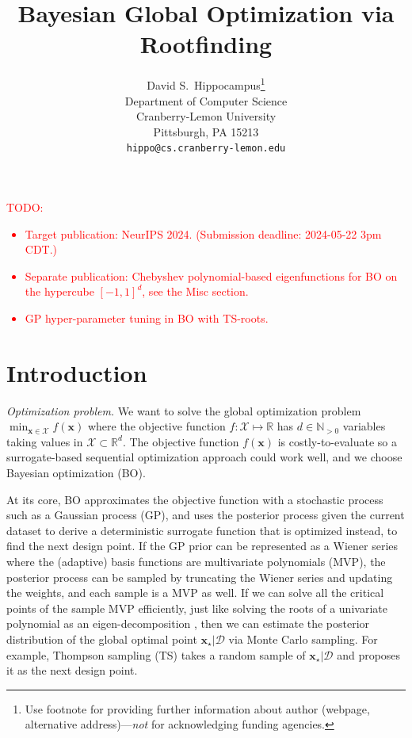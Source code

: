\documentclass{article}
\title{Bayesian Global Optimization via Rootfinding}
\author{%
  David S.~Hippocampus\thanks{Use footnote for providing further information
    about author (webpage, alternative address)---\emph{not} for acknowledging
    funding agencies.} \\
  Department of Computer Science\\
  Cranberry-Lemon University\\
  Pittsburgh, PA 15213 \\
  \texttt{hippo@cs.cranberry-lemon.edu} \\
}
\begin{document}
\maketitle


\begin{abstract}
\end{abstract}

\textcolor{red}{TODO:
\begin{itemize}
\item
  Target publication: NeurIPS 2024. (Submission deadline: 2024-05-22 3pm
  CDT.)
\item
  Separate publication: Chebyshev polynomial-based eigenfunctions for BO
  on the hypercube $[-1, 1]^d$, see the Misc section.
\item
  GP hyper-parameter tuning in BO with TS-roots.
\end{itemize}
}

\section{Introduction}

\emph{Optimization problem.} We want to solve the global optimization
problem $\min_{\mathbf{x} \in \mathcal{X}} f(\mathbf{x})$ where the
objective function $f: \mathcal{X} \mapsto \mathbb{R}$ has
$d \in \mathbb{N}_{>0}$ variables taking values in
$\mathcal{X} \subset \mathbb{R}^d$. The objective function
$f(\mathbf{x})$ is costly-to-evaluate so a surrogate-based sequential
optimization approach could work well, and we choose Bayesian
optimization (BO).

At its core, BO approximates the objective function with a stochastic
process such as a Gaussian process (GP), and uses the posterior process
given the current dataset to derive a deterministic surrogate function
that is optimized instead, to find the next design point. If the GP
prior can be represented as a Wiener series where the (adaptive) basis
functions are multivariate polynomials (MVP), the posterior process can
be sampled by truncating the Wiener series and updating the weights, and
each sample is a MVP as well. If we can solve all the critical points of
the sample MVP efficiently, just like solving the roots of a univariate
polynomial as an eigen-decomposition \cite{Trefethen2019}, then we can
estimate the posterior distribution of the global optimal point
$\mathbf{x}_\star|\mathcal{D}$ via Monte Carlo sampling. For example,
Thompson sampling (TS) takes a random sample of
$\mathbf{x}_\star|\mathcal{D}$ and proposes it as the next design
point.
\end{document}
